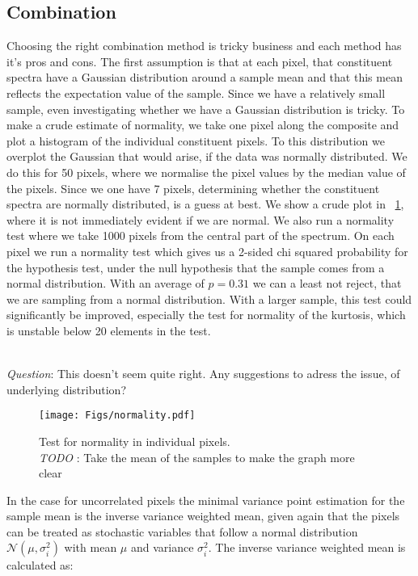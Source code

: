 \documentclass{aa}    %
\newcommand{\figref}[1]{\ref{fig:#1}}
\newcommand{\Fig}[1]{\figurename~\figref{#1}}
\newcommand{\fig}[1]{\Fig{#1}}
\newcommand{\figlabel}[1]{\label{fig:#1}}
\newcommand{\sectlabel}[1]{\label{sect:#1}}
\newcommand{\todo}[3]{{\color{#2}\emph{#1}: #3}}
\newcommand{\jstodo}[1]{\todo{ \\TODO }{green}{#1}}
\newcommand{\qtodo}[1]{\todo{\\ Question}{red}{#1}}
\begin{document}
\subsection{Combination}  \sectlabel{combine}

Choosing the right combination method is tricky business and each method has it's pros and cons. The first assumption is that at each pixel, that constituent spectra have a Gaussian distribution around a sample mean and that this mean reflects the expectation value of the sample. Since we have a relatively small sample, even investigating whether we have a Gaussian distribution is tricky. To make a crude estimate of normality, we take one pixel along the composite and plot a histogram of the individual constituent pixels. To this distribution we overplot the Gaussian that would arise, if the data was normally distributed. We do this for 50 pixels, where we normalise the pixel values by the median value of the pixels. Since we one have 7 pixels, determining whether the constituent spectra are normally distributed, is a guess at best. We show a crude plot in \fig{normality}, where it is not immediately evident if we are normal. We also run a normality test where we take 1000 pixels from the central part of the spectrum. On each pixel we run a normality test which gives us a 2-sided chi squared probability for the hypothesis test, under the null hypothesis that the sample comes from a normal distribution. With an average of $p = 0.31$ we can a least not reject, that we are sampling from a normal distribution. With a larger sample, this test could significantly be improved, especially the test for normality of the kurtosis, which is unstable below 20 elements in the test. 

\qtodo{This doesn't seem quite right. Any suggestions to adress the issue, of underlying distribution?}

\begin{figure}[hbtp]
  \centering
  \texttt{[image: Figs/normality.pdf]}
  \caption[]{Test for normality in individual pixels. \jstodo{Take the mean of the samples to make the graph more clear}}
 \figlabel{normality}
\end{figure}

In the case for uncorrelated pixels the minimal variance point estimation for the sample mean is the inverse variance weighted mean, given again that the pixels can be treated as stochastic variables that follow a normal distribution $\mathcal{N}(\mu, \sigma_i^2)$ with mean $\mu$ and variance $\sigma_i^2$. The inverse variance weighted mean is calculated as:
\end{document}
